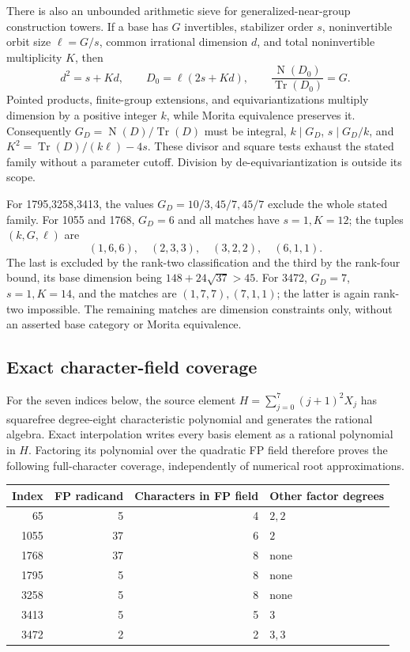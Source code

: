 There is also an unbounded arithmetic sieve for generalized-near-group
construction towers. If a base has $G$ invertibles, stabilizer order $s$,
noninvertible orbit size $\ell=G/s$, common irrational dimension $d$, and
total noninvertible multiplicity $K$, then
\[
 d^2=s+Kd,\qquad D_0=\ell(2s+Kd),\qquad
 \frac{\operatorname{N}(D_0)}{\operatorname{Tr}(D_0)}=G.
\]
Pointed products, finite-group extensions, and equivariantizations multiply
dimension by a positive integer $k$, while Morita equivalence preserves it.
Consequently $G_D=\operatorname{N}(D)/\operatorname{Tr}(D)$ must be integral,
$k\mid G_D$, $s\mid G_D/k$, and
$K^2=\operatorname{Tr}(D)/(k\ell)-4s$. These divisor and square tests
exhaust the stated family without a parameter cutoff. Division by
de-equivariantization is outside its scope.

For 1795,3258,3413, the values $G_D=10/3,45/7,45/7$ exclude the whole
stated family. For 1055 and 1768, $G_D=6$ and all matches have $s=1,K=12$;
the tuples $(k,G,\ell)$ are
\[
 (1,6,6),\quad (2,3,3),\quad (3,2,2),\quad (6,1,1).
\]
The last is excluded by the rank-two classification and the third by the
rank-four bound, its base dimension being $148+24\sqrt{37}>45$.
For 3472, $G_D=7$, $s=1,K=14$, and the matches are $(1,7,7),(7,1,1)$;
the latter is again rank-two impossible. The remaining matches are
dimension constraints only, without an asserted base category or Morita
equivalence.

\subsection{Exact character-field coverage}

For the seven indices below, the source element
$H=\sum_{j=0}^7(j+1)^2X_j$ has squarefree degree-eight characteristic
polynomial and generates the rational algebra. Exact interpolation writes
every basis element as a rational polynomial in $H$. Factoring its
polynomial over the quadratic FP field therefore proves the following
full-character coverage, independently of numerical root approximations.

\begin{center}
\begin{tabular}{r|r|r|l}
Index & FP radicand & Characters in FP field & Other factor degrees\\\hline
65 & 5 & 4 & $2,2$\\
1055 & 37 & 6 & $2$\\
1768 & 37 & 8 & none\\
1795 & 5 & 8 & none\\
3258 & 5 & 8 & none\\
3413 & 5 & 5 & $3$\\
3472 & 2 & 2 & $3,3$
\end{tabular}
\end{center}

